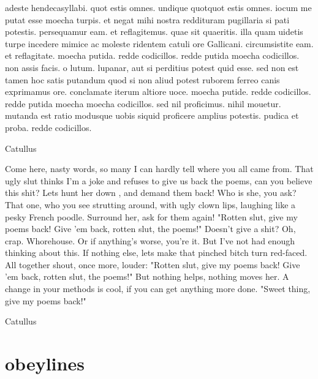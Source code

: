 \begin{minipage}{6.7cm}
\parindent=0pt 
{\obeylines

adeste hendecasyllabi. quot estis 
omnes. undique quotquot estis omnes. 
iocum me putat esse moecha turpis. 
et negat mihi nostra reddituram 
pugillaria si pati potestis. 
persequamur eam. et reflagitemus. 
quae sit quaeritis. illa quam uidetis 
turpe incedere mimice ac moleste 
ridentem catuli ore Gallicani. 
circumsistite eam. et reflagitate. 
moecha putida. redde codicillos. 
redde putida moecha codicillos. 
non assis facis. o lutum. lupanar, 
aut si perditius potest quid esse. 
sed non est tamen hoc satis putandum 
quod si non aliud potest ruborem 
ferreo canis exprimamus ore. 
conclamate iterum altiore uoce. 
moecha putide. redde codicillos. 
redde putida moecha moecha codicillos. 
sed nil proficimus. nihil mouetur. 
mutanda est ratio modusque uobis 
siquid proficere amplius potestis. 
pudica et proba. redde codicillos.

\hfil Catullus\par}
\end{minipage}
\hspace{0.8em}
\begin{minipage}{8cm}
{\obeylines
Come here, nasty words, so many I can hardly 
tell where you all came from. 
That ugly slut thinks I'm a joke 
and refuses to give us back 
the poems, can you believe this shit? 
Lets hunt her down , and demand them back! 
Who is she, you ask? That one, who you see 
strutting around, with ugly clown lips, 
laughing like a pesky French poodle. 
Surround her, ask for them again! 
"Rotten slut, give my poems back! 
Give 'em back, rotten slut, the poems!" 
Doesn't give a shit? Oh, crap. Whorehouse. 
Or if anything's worse, you're it. 
But I've not had enough thinking about this. 
If nothing else, lets make that 
pinched bitch turn red-faced. 
All together shout, once more, louder: 
"Rotten slut, give my poems back! 
Give 'em back, rotten slut, the poems!" 
But nothing helps, nothing moves her. 
A change in your methods is cool, 
if you can get anything more done. 
"Sweet thing, give my poems back!"\par

\hfil Catullus\par}
\end{minipage}


\section{obeylines}

